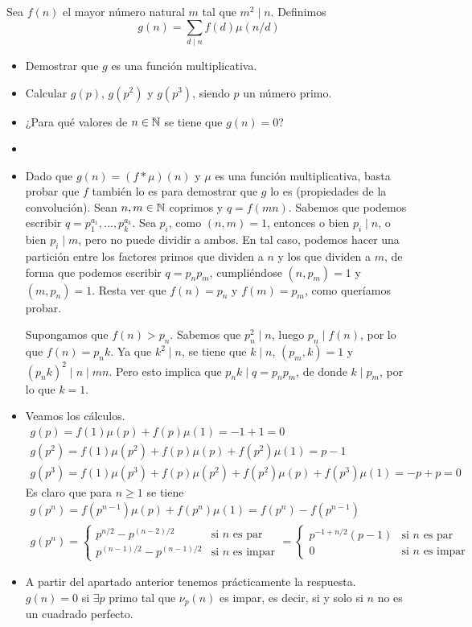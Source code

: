 \documentclass[twoside]{article}
\begin{document}
\begin{ejercicio}{9}
Sea $f(n)$ el mayor número natural $m$ tal que $m^2\mid n$. Definimos
\[
g(n) = \sum_{d\mid n} f(d)\mu(n/d)
\]
\begin{itemize}
\item Demostrar que $g$ es una función multiplicativa.
\item Calcular $g(p)$, $g(p^2)$ y $g(p^3)$, siendo $p$ un número primo.
\item ¿Para qué valores de $n\in\mathbb{N}$ se tiene que $g(n)=0$?
\end{itemize}
\begin{solucion}
\begin{itemize}
\item[]
\item Dado que $g(n) = (f\ast \mu)(n)$ y $\mu$ es una función multiplicativa, basta probar que $f$ también lo es para demostrar que $g$ lo es (propiedades de la convolución). Sean $n,m\in \mathbb{N}$ coprimos y $q=f(mn)$. Sabemos que podemos escribir $q=p_1^{a_1},\dotsc,p_k^{a_k}$. Sea $p_i$, como $(n,m)=1$, entonces o bien $p_i \mid n$, o bien $p_i \mid m$, pero no puede dividir a ambos. En tal caso, podemos hacer una partición entre los factores primos que dividen a $n$ y los que dividen a $m$, de forma que podemos escribir $q=p_np_m$, cumpliéndose $(n,p_m)=1$ y $(m,p_n)=1$. Resta ver que $f(n)=p_n$ y $f(m)=p_m$, como queríamos probar.

Supongamos que $f(n)>p_n$. Sabemos que $p_n^2\mid n$, luego $p_n \mid f(n)$, por lo que $f(n)=p_n k$. Ya que $k^2 \mid n$, se tiene que $k \mid n$, $(p_m,k)=1$ y $(p_n k)^2 \mid n \mid mn$. Pero esto implica que $p_n k \mid q = p_n p_m$, de donde $k \mid p_m$, por lo que $k=1$.
\item Veamos los cálculos.
\begin{gather*}
g(p)=f(1)\mu(p) + f(p)\mu(1) = -1+1 = 0 \\
g(p^2) = f(1)\mu(p^2) + f(p)\mu(p) + f(p^2)\mu(1) = p-1\\
g(p^3) = f(1)\mu(p^3) + f(p)\mu(p^2) + f(p^2)\mu(p) + f(p^3)\mu(1) = -p+p=0
\end{gather*}
Es claro que para $n\geq 1$ se tiene
\begin{gather*}
g(p^n) = f(p^{n-1})\mu(p) + f(p^n)\mu(1) = f(p^n)-f(p^{n-1})\\
g(p^n) = 
\begin{cases}
p^{n/2}-p^{(n-2)/2} & \text{si $n$ es par}\\
p^{(n-1)/2}-p^{(n-1)/2}	& \text{si $n$ es impar}
\end{cases} =
\begin{cases}
p^{-1+n/2}(p-1) & \text{si $n$ es par}\\
0	& \text{si $n$ es impar}
\end{cases}
\end{gather*}
\item A partir del apartado anterior tenemos prácticamente la respuesta. $g(n)=0$ si $\exists p$ primo tal que $\nu_p(n)$ es impar, es decir, si y solo si $n$ no es un cuadrado perfecto.
\end{itemize}
\end{solucion}
\end{ejercicio}
\end{document}
